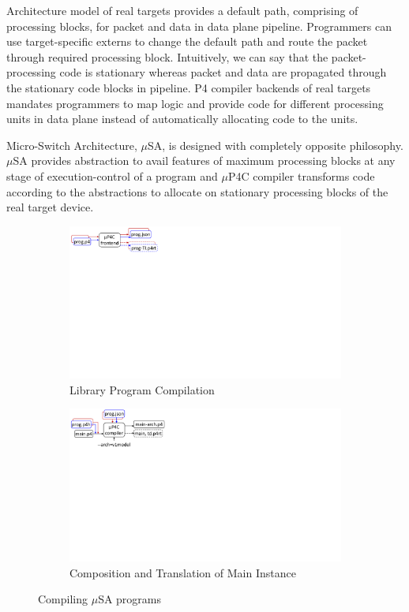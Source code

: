 \documentclass[10pt,sigconf,letterpaper,anonymous]{acmart}
\begin{document}
Architecture model of real targets provides a default path, comprising of processing blocks, for packet and data in data plane pipeline.
Programmers can use target-specific externs to change the default path and route the packet through required processing block.
Intuitively, we can say that the packet-processing code is stationary whereas packet and data are propagated through the stationary code blocks in pipeline.
P4 compiler backends of real targets mandates programmers to map logic and provide code for different processing units in data plane instead of automatically allocating code to the units. 

Micro-Switch Architecture, $\mu$SA, is designed with completely opposite philosophy.
$\mu$SA provides abstraction to avail features of maximum processing blocks at any stage of execution-control of a program and $\mu$P4C compiler transforms code according to the abstractions to allocate on stationary processing blocks of the real target device.

\begin{figure}[!h]
    \begin{subfigure}{\linewidth}
        \centering
        \includegraphics[trim=0 450 645 0, clip,scale=0.55]{mp4c-frontend}
        \caption{Library Program Compilation}
        \label{subfig:compiling-modules}
    \end{subfigure}
    \begin{subfigure}{\linewidth}
        \centering
        \includegraphics[trim=0 405 623 0, clip,scale=0.55]{mp4c-compiler}
        \caption{Composition and Translation of Main Instance}
        \label{subfig:orchestration}
    \end{subfigure}
\caption{Compiling $\mu$SA programs}
\label{fig:msa-pipelines}
\end{figure}
\end{document}
